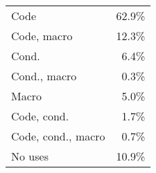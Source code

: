 \begin{tabular}{|l|r|}\hline
Code & 62.9\%\\
Code, macro & 12.3\%\\\hline
Cond. & 6.4\%\\
Cond., macro & 0.3\%\\\hline
Macro & 5.0\%\\\hline
Code, cond. & 1.7\%\\
Code, cond., macro & 0.7\%\\\hline
No uses & 10.9\%\\\hline
\end{tabular}
